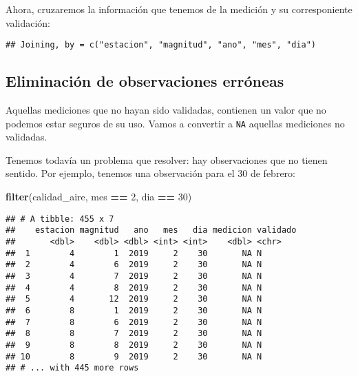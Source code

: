 \documentclass[]{article}
\newenvironment{Shaded}{\begin{snugshade}}{\end{snugshade}}
\newcommand{\DecValTok}[1]{\textcolor[rgb]{0.00,0.00,0.81}{#1}}
\newcommand{\KeywordTok}[1]{\textcolor[rgb]{0.13,0.29,0.53}{\textbf{#1}}}
\newcommand{\NormalTok}[1]{#1}
\newcommand{\OperatorTok}[1]{\textcolor[rgb]{0.81,0.36,0.00}{\textbf{#1}}}
\newcommand{\OtherTok}[1]{\textcolor[rgb]{0.56,0.35,0.01}{#1}}
\newcommand{\StringTok}[1]{\textcolor[rgb]{0.31,0.60,0.02}{#1}}
\begin{document}
Ahora, cruzaremos la información que tenemos de la medición y su
corresponiente validación:

\begin{Shaded}
\end{Shaded}

\begin{verbatim}
## Joining, by = c("estacion", "magnitud", "ano", "mes", "dia")
\end{verbatim}

\hypertarget{eliminacion-de-observaciones-erroneas}{%
\subsection{Eliminación de observaciones
erróneas}\label{eliminacion-de-observaciones-erroneas}}

Aquellas mediciones que no hayan sido validadas, contienen un valor que
no podemos estar seguros de su uso. Vamos a convertir a \texttt{NA}
aquellas mediciones no validadas.

\begin{Shaded}
\end{Shaded}

Tenemos todavía un problema que resolver: hay observaciones que no
tienen sentido. Por ejemplo, tenemos una observación para el 30 de
febrero:

\begin{Shaded}
\begin{Highlighting}[]
\KeywordTok{filter}\NormalTok{(calidad_aire, mes }\OperatorTok{==}\StringTok{ }\DecValTok{2}\NormalTok{, dia }\OperatorTok{==}\StringTok{ }\DecValTok{30}\NormalTok{)}
\end{Highlighting}
\end{Shaded}

\begin{verbatim}
## # A tibble: 455 x 7
##    estacion magnitud   ano   mes   dia medicion validado
##       <dbl>    <dbl> <dbl> <int> <int>    <dbl> <chr>   
##  1        4        1  2019     2    30       NA N       
##  2        4        6  2019     2    30       NA N       
##  3        4        7  2019     2    30       NA N       
##  4        4        8  2019     2    30       NA N       
##  5        4       12  2019     2    30       NA N       
##  6        8        1  2019     2    30       NA N       
##  7        8        6  2019     2    30       NA N       
##  8        8        7  2019     2    30       NA N       
##  9        8        8  2019     2    30       NA N       
## 10        8        9  2019     2    30       NA N       
## # ... with 445 more rows
\end{verbatim}
\end{document}
